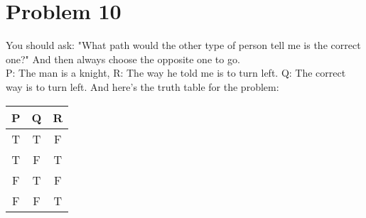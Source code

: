 \documentclass{article}
\begin{document}
\section{Problem 10}
You should ask: "What path would the other type of person tell me is the correct one?" And then always choose the opposite one to go.\\
P: The man is a knight, R: The way he told me is to turn left. Q: The correct way is to turn left. And here's the truth table for the problem:\\
\begin{table}[H]
\centering
\begin{tabular}{|c|c|c|}
\hline
P & Q & R\\
\hline
T & T & F\\
T & F & T\\
F & T & F\\
F & F & T\\
\hline
\end{tabular}
\end{table}
\end{document}
